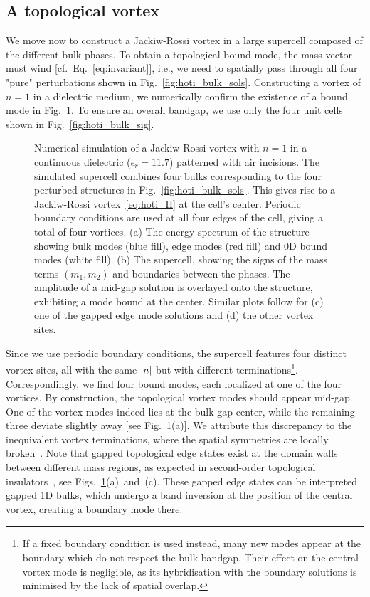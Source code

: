 \subsection{A topological vortex}

We move now to construct a Jackiw-Rossi vortex in a large supercell composed of the different bulk phases. To obtain a topological bound mode, the mass vector must wind [cf.~Eq.~\eqref{eq:invariant}], i.e., we need to spatially pass through all four "pure" perturbations shown in Fig.~\ref{fig:hoti_bulk_sols}. 
Constructing a vortex of $n=1$ in a dielectric medium, we numerically confirm the existence of a bound mode in Fig.~\ref{fig:hoti_fig4}. To ensure an overall bandgap, we use only the four unit cells shown in Fig.~\ref{fig:hoti_bulk_sig}.
%
\begin{figure} [h!]
	\centering
	
	\caption{Numerical simulation of a Jackiw-Rossi vortex with $n = 1$ in a continuous dielectric ($\epsilon_r = 11.7$) patterned with air incisions. The simulated supercell combines four bulks corresponding to the four perturbed structures in Fig.~\ref{fig:hoti_bulk_sols}. This gives rise to a Jackiw-Rossi vortex~\eqref{eq:hoti_H} at the cell's center. Periodic boundary conditions are used at all four edges of the cell, giving a total of four vortices. (a) The energy spectrum of the structure showing bulk modes (blue fill), edge modes (red fill) and 0D bound modes (white fill). (b) The supercell, showing the signs of the mass terms $(m_1, m_2)$ and boundaries between the phases. The amplitude of a mid-gap solution is overlayed onto the structure, exhibiting a mode bound at the center. Similar plots follow for (c) one of the gapped edge mode solutions and (d) the other vortex sites.}
	\label{fig:hoti_fig4}
\end{figure}
%
Since we use periodic boundary conditions, the supercell features four distinct vortex sites, all with the same $\abs{n}$ but with different terminations\footnote{If a fixed boundary condition is used instead, many new modes appear at the boundary which do not respect the bulk bandgap. Their effect on the central vortex mode is negligible, as its hybridisation with the boundary solutions is minimised by the lack of spatial overlap.}. Correspondingly, we find four bound modes, each localized at one of the four vortices. By construction, the topological vortex modes should appear mid-gap. One of the vortex modes indeed lies at the bulk gap center, while the remaining three deviate slightly away [see Fig.~\ref{fig:hoti_fig4}(a)]. We attribute this discrepancy to the inequivalent vortex terminations, where the spatial symmetries are locally broken~\cite{Gao_2020}. Note that gapped topological edge states exist at the domain walls between different mass regions, as expected in second-order topological insulators~\cite{Benalcazar_2017a,Benalcazar_2017b,Petrides_2020}, see Figs.~\ref{fig:hoti_fig4}(a)~and~(c). These gapped edge states can be interpreted gapped 1D bulks, which undergo a band inversion at the position of the central vortex, creating a boundary mode there.  


